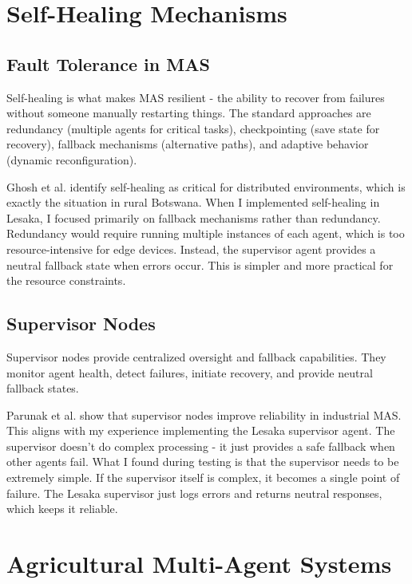 \section{Self-Healing Mechanisms}

\subsection{Fault Tolerance in MAS}

Self-healing is what makes MAS resilient - the ability to recover from failures without someone manually restarting things. The standard approaches are redundancy (multiple agents for critical tasks), checkpointing (save state for recovery), fallback mechanisms (alternative paths), and adaptive behavior (dynamic reconfiguration).

Ghosh et al. \cite{ghosh2007self} identify self-healing as critical for distributed environments, which is exactly the situation in rural Botswana. When I implemented self-healing in Lesaka, I focused primarily on fallback mechanisms rather than redundancy. Redundancy would require running multiple instances of each agent, which is too resource-intensive for edge devices. Instead, the supervisor agent provides a neutral fallback state when errors occur. This is simpler and more practical for the resource constraints.

\subsection{Supervisor Nodes}

Supervisor nodes provide centralized oversight and fallback capabilities. They monitor agent health, detect failures, initiate recovery, and provide neutral fallback states.

Parunak et al. \cite{parunak2001practical} show that supervisor nodes improve reliability in industrial MAS. This aligns with my experience implementing the Lesaka supervisor agent. The supervisor doesn't do complex processing - it just provides a safe fallback when other agents fail. What I found during testing is that the supervisor needs to be extremely simple. If the supervisor itself is complex, it becomes a single point of failure. The Lesaka supervisor just logs errors and returns neutral responses, which keeps it reliable.

\section{Agricultural Multi-Agent Systems}

